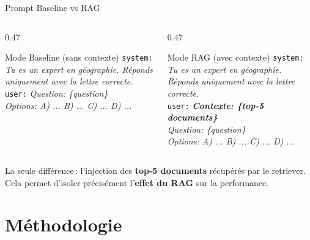 \documentclass[aspectratio=169, 12pt]{beamer}
\begin{document}
\begin{frame}{Prompt Baseline vs RAG}
  \begin{columns}[T]
    \begin{column}{0.47\textwidth}
      \begin{block}{Mode Baseline (sans contexte)}
        \small
        \texttt{system:} \textit{Tu es un expert en g\'eographie. R\'eponds uniquement avec la lettre correcte.}\\[0.2cm]
        \texttt{user:} \textit{Question: \{question\}\\Options: A) ... B) ... C) ... D) ...}
      \end{block}
    \end{column}
    \begin{column}{0.47\textwidth}
      \begin{block}{Mode RAG (avec contexte)}
        \small
        \texttt{system:} \textit{Tu es un expert en g\'eographie. R\'eponds uniquement avec la lettre correcte.}\\[0.2cm]
        \texttt{user:} \textit{\textbf{Contexte: \{top-5 documents\}}\\Question: \{question\}\\Options: A) ... B) ... C) ... D) ...}
      \end{block}
    \end{column}
  \end{columns}

  \vspace{0.3cm}

  \centering
  La seule diff\'erence\,: l'injection des \textbf{top-5 documents} r\'ecup\'er\'es par le retriever.\\
  Cela permet d'isoler pr\'ecis\'ement l'\textbf{effet du RAG} sur la performance.
\end{frame}

\section{M\'ethodologie}
\end{document}
